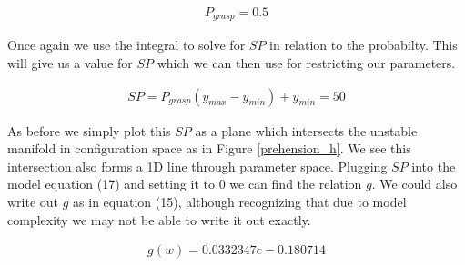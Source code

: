 \documentclass[letterpaper]{article}
\begin{document}
\begin{eqnarray}
  P_{grasp} = 0.5
\end{eqnarray}

Once again we use the integral to solve for $SP$ in relation to the probabilty. This
will give us a value for $SP$ which we can then use for restricting our parameters.

\begin{eqnarray}
  SP = P_{grasp}(y_{max}-y_{min}) + y_{min} = 50
\end{eqnarray}

As before we simply plot this $SP$ as a plane which intersects the unstable manifold
in configuration space as in Figure \ref{prehension_h}. We see
this intersection also
forms a 1D line through parameter space. Plugging $SP$ into the model equation (17)
and setting it to $0$ we can find the relation $g$.
We could also write out $g$ as in equation (15), although recognizing that due to
model complexity we may not be able to write it out exactly.

\begin{equation}
  \begin{aligned}
  g(w) = 0.0332347 c-0.180714
  \end{aligned}
\end{equation}
\end{document}
